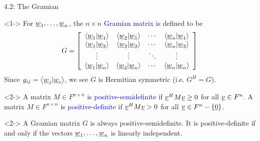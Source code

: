 \documentclass[10pt,letterpaper,english]{beamer}
\begin{document}
\begin{frame}{4.2: The Gramian}

\begin{definition}<1->
For $\underline{w}_1,\ldots,\underline{w}_n$, the $n \times n$ \textcolor{blue}{Gramian matrix} is defined to be \vspace{-1.5mm}
\begin{equation*}
G = \left[ \begin{array}{cccc}
\left\langle \vecnot{w}_1 | \vecnot{w}_1 \right\rangle
& \left\langle \vecnot{w}_2 | \vecnot{w}_1 \right\rangle & \cdots
& \left\langle \vecnot{w}_n | \vecnot{w}_1 \right\rangle \\
\left\langle \vecnot{w}_1 | \vecnot{w}_2 \right\rangle
& \left\langle \vecnot{w}_2 | \vecnot{w}_2 \right\rangle & \cdots
& \left\langle \vecnot{w}_n | \vecnot{w}_2 \right\rangle \\
\vdots & \vdots & \ddots & \vdots \\
\left\langle \vecnot{w}_1 | \vecnot{w}_n \right\rangle
& \left\langle \vecnot{w}_2 | \vecnot{w}_n \right\rangle & \cdots
& \left\langle \vecnot{w}_n | \vecnot{w}_n \right\rangle
\end{array} \right] \vspace{-1mm}
\end{equation*}
Since $g_{ij} = \left\langle \underline{w}_j | \underline{w}_i \right\rangle$, we see $G$ is Hermitian symmetric (i.e. $G^H = G$).
\end{definition}

\begin{definition}<2->
A matrix $M\in F^{n \times n}$ is \textcolor{blue}{positive-semidefinite} if $\underline{v}^H M \underline{v} \geq 0$ for all $\underline{v} \in F^n$.
A matrix $M\in F^{n \times n}$ is \textcolor{blue}{positive-definite} if $\underline{v}^H M \underline{v} > 0$ for all $\underline{v} \in F^n - \left\{ \underline{0} \right\}$.
\end{definition}


\begin{theorem}<2->
A Gramian matrix $G$ is always positive-semidefinite.
It is positive-definite if and only if the vectors $\underline{w}_1, \ldots, \underline{w}_n$ is linearly independent.
\end{theorem}


\end{frame}
\end{document}
